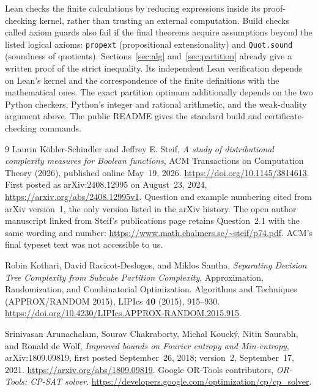 \documentclass[11pt]{article}
\begin{document}
Lean checks the finite calculations by reducing expressions inside its
proof-checking kernel, rather than trusting an external computation.
Build checks called axiom guards also fail if the final theorems acquire
assumptions beyond the listed logical axioms: \texttt{propext}
(propositional extensionality) and \texttt{Quot.sound} (soundness of
quotients). Sections~\ref{sec:alg} and~\ref{sec:partition} already give a
written proof of the strict inequality. Its independent Lean verification
depends on Lean's kernel and the correspondence of the finite definitions
with the mathematical ones. The exact partition
optimum additionally depends on the two Python checkers, Python's integer
and rational arithmetic, and the weak-duality argument above. The public
README gives the standard build and certificate-checking commands.

\begin{thebibliography}{9}
Laurin K\"ohler-Schindler and Jeffrey E. Steif,
\emph{A study of distributional complexity measures for Boolean functions},
ACM Transactions on Computation Theory (2026), published online May~19, 2026.
\url{https://doi.org/10.1145/3814613}.
First posted as arXiv:2408.12995 on August~23, 2024,
\url{https://arxiv.org/abs/2408.12995v1}.
Question and example numbering cited from arXiv version~1, the only version
listed in the arXiv history. The open author manuscript linked from Steif's
publications page retains Question~2.1 with the same wording and number:
\url{https://www.math.chalmers.se/~steif/p74.pdf}.
ACM's final typeset text was not accessible to us.

Robin Kothari, David Racicot-Desloges, and Miklos Santha,
\emph{Separating Decision Tree Complexity from Subcube Partition Complexity},
Approximation, Randomization, and Combinatorial Optimization.
Algorithms and Techniques (APPROX/RANDOM 2015),
LIPIcs \textbf{40} (2015), 915--930.
\url{https://doi.org/10.4230/LIPIcs.APPROX-RANDOM.2015.915}.

Srinivasan Arunachalam, Sourav Chakraborty, Michal Kouck\'y, Nitin Saurabh,
and Ronald de Wolf,
\emph{Improved bounds on Fourier entropy and Min-entropy},
arXiv:1809.09819, first posted September~26, 2018; version~2,
September~17, 2021.
\url{https://arxiv.org/abs/1809.09819}.
Google OR-Tools contributors,
\emph{OR-Tools: CP-SAT solver}.
\url{https://developers.google.com/optimization/cp/cp_solver}.

\end{thebibliography}
\end{document}
